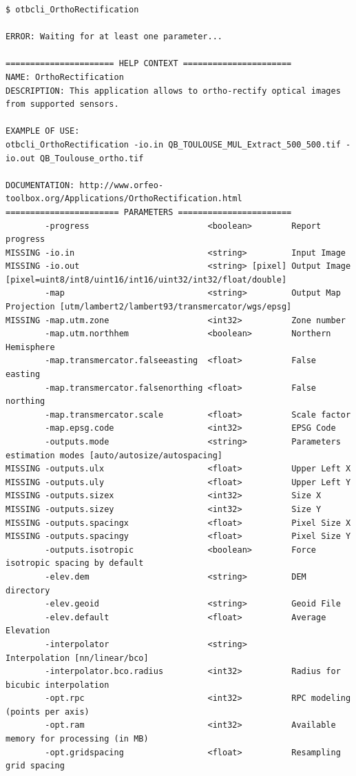 \begin{scriptsize}
\begin{verbatim}
$ otbcli_OrthoRectification

ERROR: Waiting for at least one parameter...

====================== HELP CONTEXT ======================
NAME: OrthoRectification
DESCRIPTION: This application allows to ortho-rectify optical images from supported sensors.

EXAMPLE OF USE: 
otbcli_OrthoRectification -io.in QB_TOULOUSE_MUL_Extract_500_500.tif -io.out QB_Toulouse_ortho.tif

DOCUMENTATION: http://www.orfeo-toolbox.org/Applications/OrthoRectification.html
======================= PARAMETERS =======================
        -progress                        <boolean>        Report progress 
MISSING -io.in                           <string>         Input Image 
MISSING -io.out                          <string> [pixel] Output Image  [pixel=uint8/int8/uint16/int16/uint32/int32/float/double]
        -map                             <string>         Output Map Projection [utm/lambert2/lambert93/transmercator/wgs/epsg]
MISSING -map.utm.zone                    <int32>          Zone number 
        -map.utm.northhem                <boolean>        Northern Hemisphere 
        -map.transmercator.falseeasting  <float>          False easting 
        -map.transmercator.falsenorthing <float>          False northing 
        -map.transmercator.scale         <float>          Scale factor 
        -map.epsg.code                   <int32>          EPSG Code 
        -outputs.mode                    <string>         Parameters estimation modes [auto/autosize/autospacing]
MISSING -outputs.ulx                     <float>          Upper Left X 
MISSING -outputs.uly                     <float>          Upper Left Y 
MISSING -outputs.sizex                   <int32>          Size X 
MISSING -outputs.sizey                   <int32>          Size Y 
MISSING -outputs.spacingx                <float>          Pixel Size X 
MISSING -outputs.spacingy                <float>          Pixel Size Y 
        -outputs.isotropic               <boolean>        Force isotropic spacing by default 
        -elev.dem                        <string>         DEM directory 
        -elev.geoid                      <string>         Geoid File 
        -elev.default                    <float>          Average Elevation 
        -interpolator                    <string>         Interpolation [nn/linear/bco]
        -interpolator.bco.radius         <int32>          Radius for bicubic interpolation 
        -opt.rpc                         <int32>          RPC modeling (points per axis) 
        -opt.ram                         <int32>          Available memory for processing (in MB) 
        -opt.gridspacing                 <float>          Resampling grid spacing 
\end{verbatim}
\end{scriptsize}


